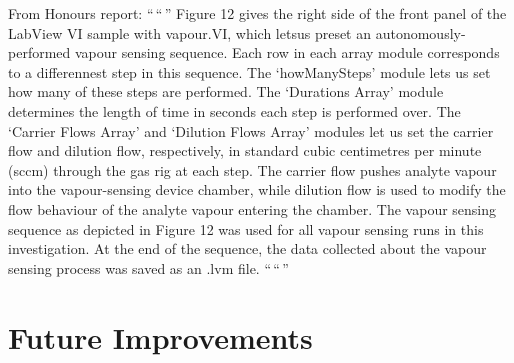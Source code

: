 \documentclass[
  a4paper,
]{scrbook}
\begin{document}
From Honours report: ``\,``\,'' Figure 12 gives the right side of the
front panel of the LabView VI sample with vapour.VI, which letsus preset
an autonomously-performed vapour sensing sequence. Each row in each
array module corresponds to a differennest step in this sequence. The
`howManySteps' module lets us set how many of these steps are performed.
The `Durations Array' module determines the length of time in seconds
each step is performed over. The `Carrier Flows Array' and `Dilution
Flows Array' modules let us set the carrier flow and dilution flow,
respectively, in standard cubic centimetres per minute (sccm) through
the gas rig at each step. The carrier flow pushes analyte vapour into
the vapour-sensing device chamber, while dilution flow is used to modify
the flow behaviour of the analyte vapour entering the chamber. The
vapour sensing sequence as depicted in Figure 12 was used for all vapour
sensing runs in this investigation. At the end of the sequence, the data
collected about the vapour sensing process was saved as an .lvm file.
``\,``\,''

\hypertarget{future-improvements}{%
\section{Future Improvements}\label{future-improvements}}


\backmatter
\printbibliography
\end{document}
